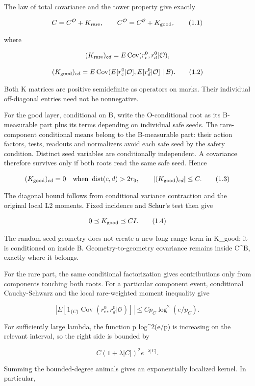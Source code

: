 \documentclass[
  11pt,
]{article}
\begin{document}
The law of total covariance and the tower property give exactly

\[
 C=C^{\mathcal O}+K_{\rm rare},\qquad
 C^{\mathcal O}=C^{\mathcal B}+K_{\rm good},
\tag{1.1}
\]

where

\[
 (K_{\rm rare})_{cd}=E\operatorname{Cov}(r_c^0,r_d^0|\mathcal O),
\]

\[
 (K_{\rm good})_{cd}
 =E\operatorname{Cov}(E[r_c^0|\mathcal O],E[r_d^0|\mathcal O]\mid\mathcal B).
\tag{1.2}
\]

Both K matrices are positive semidefinite as operators on marks. Their
individual off-diagonal entries need not be nonnegative.

For the good layer, conditional on B, write the O-conditional root as
its B-measurable part plus its terms depending on individual safe seeds.
The rare-component conditional means belong to the B-measurable part:
their action factors, tests, readouts and normalizers avoid each safe
seed by the safety condition. Distinct seed variables are conditionally
independent. A covariance therefore survives only if both roots read the
same safe seed. Hence

\[
 (K_{\rm good})_{cd}=0
 \quad\text{when }\operatorname{dist}(c,d)>2r_0,
\qquad
 |(K_{\rm good})_{cd}|\le C.
\tag{1.3}
\]

The diagonal bound follows from conditional variance contraction and the
original local L2 moments. Fixed incidence and Schur's test then give

\[
 0\preceq K_{\rm good}\preceq C I.
\tag{1.4}
\]

The random seed geometry does not create a new long-range term in
K\_good: it is conditioned on inside B. Geometry-to-geometry covariance
remains inside C\^{}B, exactly where it belongs.

For the rare part, the same conditional factorization gives
contributions only from components touching both roots. For a particular
component event, conditional Cauchy-Schwarz and the local rare-weighted
moment inequality give

\[
 \left|E[1_{\{C\}}\operatorname{Cov}(r_c^0,r_d^0|\mathcal O)]\right|
 \le C p_C\log^2(e/p_C).
\tag{1.5}
\]

For sufficiently large lambda, the function p log\^{}2(e/p) is
increasing on the relevant interval, so the right side is bounded by

\[
 C(1+\lambda |C|)^2e^{-\lambda|C|}.
\]

Summing the bounded-degree animals gives an exponentially localized
kernel. In particular,
\end{document}

